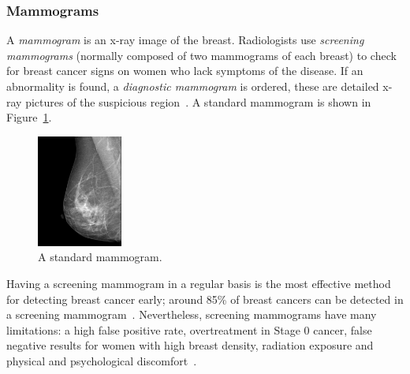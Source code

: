 \subsubsection{Mammograms}
A \emph{mammogram} is an x-ray image of the breast. Radiologists use \emph{screening mammograms} (normally composed of two mammograms of each breast) to check for breast cancer signs on women who lack symptoms of the disease. If an abnormality is found, a \emph{diagnostic mammogram} is ordered, these are detailed x-ray pictures of the suspicious region~\cite{NCI2014}. A standard mammogram is shown in Figure~\ref{fig:normalMammogram}.

\begin{figure}[h]
	\centering
	\includegraphics[width = 0.25\textwidth]{plots/normalMammogram.jpg}
	\caption[A digital mammogram]{A standard mammogram.}
	\label{fig:normalMammogram}
\end{figure}

Having a screening mammogram in a regular basis is the most effective method for detecting breast cancer early; around 85\% of breast cancers can be detected in a screening mammogram~\cite{BCSC2013}. Nevertheless, screening mammograms have many limitations: a high false positive rate, overtreatment in Stage 0 cancer, false negative results for women with high breast density, radiation exposure and physical and psychological discomfort~\cite{NCI2014}.


